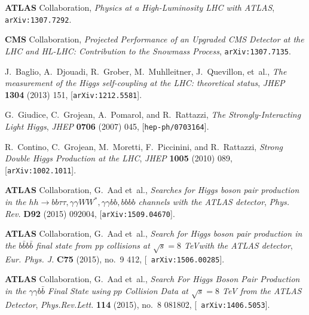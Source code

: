 \documentclass[a4paper,11pt]{article}
\begin{document}

\providecommand{\href}[2]{#2}\begingroup\raggedright\begin{thebibliography}{100}

{\bf ATLAS} Collaboration, {\it {Physics at a High-Luminosity LHC with ATLAS}},
   \href{http://arxiv.org/abs/1307.7292}{{\tt arXiv:1307.7292}}.

{\bf CMS} Collaboration, {\it {Projected Performance of an Upgraded CMS
  Detector at the LHC and HL-LHC: Contribution to the Snowmass Process}},
  \href{http://arxiv.org/abs/1307.7135}{{\tt arXiv:1307.7135}}.

J.~Baglio, A.~Djouadi, R.~Grober, M.~Muhlleitner, J.~Quevillon, et~al., {\it
  {The measurement of the Higgs self-coupling at the LHC: theoretical status}},
   {\em JHEP} {\bf 1304} (2013) 151,
  [\href{http://arxiv.org/abs/1212.5581}{{\tt arXiv:1212.5581}}].

G.~Giudice, C.~Grojean, A.~Pomarol, and R.~Rattazzi, {\it {The
  Strongly-Interacting Light Higgs}},  {\em JHEP} {\bf 0706} (2007) 045,
  [\href{http://arxiv.org/abs/hep-ph/0703164}{{\tt hep-ph/0703164}}].

R.~Contino, C.~Grojean, M.~Moretti, F.~Piccinini, and R.~Rattazzi, {\it {Strong
  Double Higgs Production at the LHC}},  {\em JHEP} {\bf 1005} (2010) 089,
  [\href{http://arxiv.org/abs/1002.1011}{{\tt arXiv:1002.1011}}].

{\bf ATLAS} Collaboration, G.~Aad et~al., {\it {Searches for Higgs boson pair
  production in the $hh\to bb\tau\tau, \gamma\gamma WW^*, \gamma\gamma bb,
  bbbb$ channels with the ATLAS detector}},  {\em Phys. Rev.} {\bf D92} (2015)
  092004, [\href{http://arxiv.org/abs/1509.04670}{{\tt arXiv:1509.04670}}].

{\bf ATLAS} Collaboration, G.~Aad et~al., {\it {Search for Higgs boson pair
  production in the $b\bar{b}b\bar{b}$ final state from pp collisions at
  $\sqrt{s} = 8$ TeVwith the ATLAS detector}},  {\em Eur. Phys. J.} {\bf C75}
  (2015), no.~9 412, [\href{http://arxiv.org/abs/1506.00285}{{\tt
  arXiv:1506.00285}}].

{\bf ATLAS} Collaboration, G.~Aad et~al., {\it {Search For Higgs Boson Pair
  Production in the $\gamma\gamma b\bar{b}$ Final State using $pp$ Collision
  Data at $\sqrt{s}=8$ TeV from the ATLAS Detector}},  {\em Phys.Rev.Lett.}
  {\bf 114} (2015), no.~8 081802, [\href{http://arxiv.org/abs/1406.5053}{{\tt
  arXiv:1406.5053}}].


\end{thebibliography}
\end{document}
